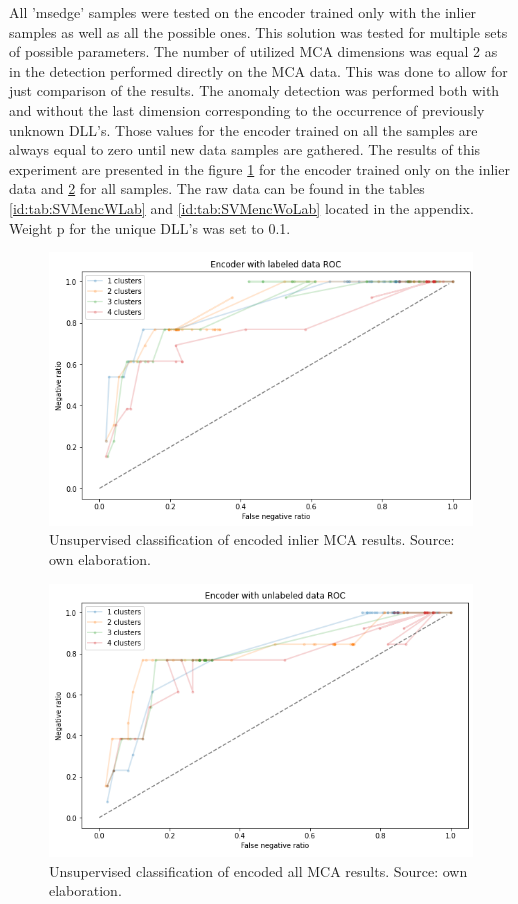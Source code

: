 \documentclass[a4paper,twoside,12pt]{book}
\begin{document}
All 'msedge' samples were tested on the encoder trained only with the inlier samples as well
as all the possible ones.
This solution was tested for multiple sets of possible parameters. The number of utilized MCA 
dimensions was equal 2 as in the detection performed directly on the MCA data. This was done to 
allow for just comparison of the results. The anomaly detection was performed
both with and without the last dimension corresponding to the occurrence of previously unknown DLL's. Those
values for the encoder trained on all the samples are always equal to zero until new data samples
are gathered.
The results of this experiment are presented in the figure \ref{fig:EncROCwLab} for 
the encoder trained only on the inlier data and \ref{fig:EncROCwoLab} for all samples. The raw data
can be found in the tables \ref{id:tab:SVMencWLab} and \ref{id:tab:SVMencWoLab} located in the 
appendix. Weight p for the unique DLL's was set to 0.1.

\begin{figure}
	\centering
	\includegraphics[scale=0.9]{images/EncROCwLabKF.PNG}
	\caption{Unsupervised classification of encoded inlier MCA results. Source: own elaboration.}
	\label{fig:EncROCwLab}
 \end{figure}

 \begin{figure}
	\centering
	\includegraphics[scale=0.9]{images/EncROCwoLabKF.PNG}
	\caption{Unsupervised classification of encoded all MCA results. Source: own elaboration.}
	\label{fig:EncROCwoLab}
 \end{figure}
\end{document}
